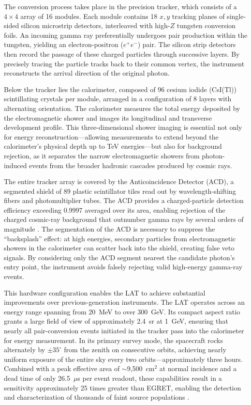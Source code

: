 The conversion process takes place in the precision tracker, which consists of a $4 \times 4$ array of 16 modules.
Each module contains 18 $x,y$ tracking planes of single-sided silicon microstrip detectors, interleaved with high-$Z$ tungsten conversion foils.
An incoming gamma ray preferentially undergoes pair production within the tungsten, yielding an electron-positron ($e^+e^-$) pair.
The silicon strip detectors then record the passage of these charged particles through successive layers.
By precisely tracing the particle tracks back to their common vertex, the instrument reconstructs the arrival direction of the original photon.

Below the tracker lies the calorimeter, composed of 96 cesium iodide (CsI(Tl)) scintillating crystals per module, arranged in a configuration of 8 layers with alternating orientation.
The calorimeter measures the total energy deposited by the electromagnetic shower and images its longitudinal and transverse development profile.
This three-dimensional shower imaging is essential not only for energy reconstruction---allowing measurements to extend beyond the calorimeter's physical depth up to TeV energies---but also for background rejection, as it separates the narrow electromagnetic showers from photon-induced events from the broader hadronic cascades produced by cosmic rays.

The entire tracker array is covered by the Anticoincidence Detector (ACD), a segmented shield of 89 plastic scintillator tiles read out by wavelength-shifting fibers and photomultiplier tubes.
The ACD provides a charged-particle detection efficiency exceeding 0.9997 averaged over its area, enabling rejection of the charged cosmic-ray background that outnumber gamma rays by several orders of magnitude \cite{Atwood:2009ez}.
The segmentation of the ACD is necessary to suppress the ``backsplash'' effect: at high energies, secondary particles from electromagnetic showers in the calorimeter can scatter back into the shield, creating false veto signals.
By considering only the ACD segment nearest the candidate photon's entry point, the instrument avoids falsely rejecting valid high-energy gamma-ray events.

This hardware configuration enables the LAT to achieve substantial improvements over previous-generation instruments.
The LAT operates across an energy range spanning from 20~MeV to over 300~GeV.
Its compact aspect ratio grants a large field of view of approximately 2.4~sr at 1~GeV, ensuring that nearly all pair-conversion events initiated in the tracker pass into the calorimeter for energy measurement.
In its primary survey mode, the spacecraft rocks alternately by $\pm 35^\circ$ from the zenith on consecutive orbits, achieving nearly uniform exposure of the entire sky every two orbits---approximately three hours.
Combined with a peak effective area of $\sim$9,500~cm$^2$ at normal incidence and a dead time of only 26.5~$\mu$s per event readout, these capabilities result in a sensitivity approximately 25 times greater than EGRET, enabling the detection and characterization of thousands of faint source populations \cite{Atwood:2009ez}.


